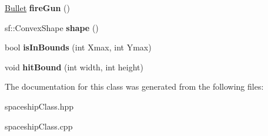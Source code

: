 \begin{DoxyCompactItemize}
\hyperlink{class_bullet}{Bullet} {\bfseries fire\+Gun} ()
\item 
\mbox{\label{class_spaceship_a36fa0c748c612b89853f8880edec8bb4}} 
sf\+::\+Convex\+Shape {\bfseries shape} ()
\item 
\mbox{\label{class_spaceship_aefedea52d45f11b58127b6ffe8e6daef}} 
bool {\bfseries is\+In\+Bounds} (int Xmax, int Ymax)
\item 
\mbox{\label{class_spaceship_ad6e993a54fd2e46b0a6fbdf05915ca79}} 
void {\bfseries hit\+Bound} (int width, int height)
\end{DoxyCompactItemize}


The documentation for this class was generated from the following files\+:\begin{DoxyCompactItemize}
\item 
spaceship\+Class.\+hpp\item 
spaceship\+Class.\+cpp\end{DoxyCompactItemize}
